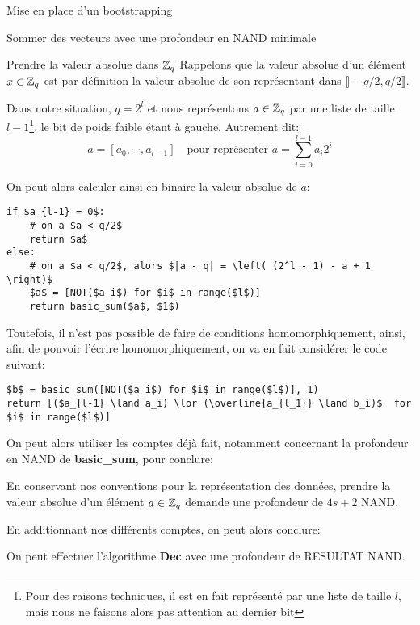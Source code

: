 \begin{section}{Mise en place d'un bootstrapping}
\begin{subsection}{Sommer des vecteurs avec une profondeur en NAND minimale}
\end{subsection}
\begin{subsection}{Prendre la valeur absolue dans $\mathbb{Z}_q$}
Rappelons que la valeur absolue d'un élément $x\in \mathbb{Z}_q$ est par
définition la valeur absolue de son représentant dans $\rrbracket -q/2,
q/2\rrbracket$. 

Dans notre situation, $q = 2^l$ et nous représentons $a\in \mathbb{Z}_q$ par une liste de
taille $l-1$\footnote{Pour des raisons techniques, il est en fait
représenté par une liste de taille $l$, mais nous ne faisons alors pas
attention au dernier bit}, le bit de poids faible étant à gauche.
Autrement dit:
\[ a = [a_0, \cdots, a_{l-1}] \quad \text{pour représenter } a = \sum_{i=0}^{l-1} a_i 2^i\]

	On peut alors calculer ainsi en binaire la valeur absolue de $a$:

\vspace{0.5cm}
\begin{lstlisting}
if $a_{l-1} = 0$: 
	# on a $a < q/2$
	return $a$
else:
	# on a $a < q/2$, alors $|a - q| = \left( (2^l - 1) - a + 1 \right)$
	$a$ = [NOT($a_i$) for $i$ in range($l$)]
	return basic_sum($a$, $1$)
\end{lstlisting}

Toutefois, il n'est pas possible de faire de conditions homomorphiquement,
ainsi, afin de pouvoir l'écrire homomorphiquement, on va en fait considérer 
le code suivant:

\vspace{0.5cm}
\begin{lstlisting}
$b$ = basic_sum([NOT($a_i$) for $i$ in range($l$)], 1)
return [($a_{l-1} \land a_i) \lor (\overline{a_{l_1}} \land b_i)$  for $i$ in range($l$)]
\end{lstlisting}

On peut alors utiliser les comptes déjà fait, notamment concernant la
profondeur en NAND de \textbf{basic\_sum}, pour conclure:
\begin{prop}
En conservant nos conventions pour la représentation des données, prendre la valeur absolue
d'un élément $a\in \mathbb{Z}_q$ demande une profondeur de $4s + 2$ NAND.
\end{prop}
\end{subsection}
En additionnant nos différents comptes, on peut alors conclure:

\begin{prop}
On peut effectuer l'algorithme \textbf{Dec} avec une profondeur de
RESULTAT NAND.
\end{prop}
	



\end{section}
